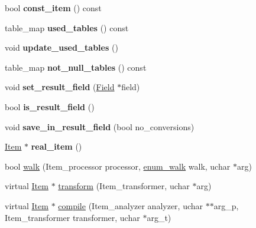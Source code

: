 \begin{DoxyCompactItemize}
\item 
\mbox{\label{classItem__ref_a089ac433fda5b4af1dcd7a5cdf040bb9}} 
bool {\bfseries const\+\_\+item} () const
\item 
\mbox{\label{classItem__ref_a0e11923750254430f834990109c2900a}} 
table\+\_\+map {\bfseries used\+\_\+tables} () const
\item 
\mbox{\label{classItem__ref_acf5ac85e846bfabbcc0da3c3f1b6320d}} 
void {\bfseries update\+\_\+used\+\_\+tables} ()
\item 
\mbox{\label{classItem__ref_a4289b25b0ea00d58796428d46011201e}} 
table\+\_\+map {\bfseries not\+\_\+null\+\_\+tables} () const
\item 
\mbox{\label{classItem__ref_ad004468f78d6395eedc8647dee1033ee}} 
void {\bfseries set\+\_\+result\+\_\+field} (\mbox{\hyperlink{classField}{Field}} $\ast$field)
\item 
\mbox{\label{classItem__ref_aa951652819cce2b03258713e2528b224}} 
bool {\bfseries is\+\_\+result\+\_\+field} ()
\item 
\mbox{\label{classItem__ref_a5adc941f24a078e1a17d9c87bce4d886}} 
void {\bfseries save\+\_\+in\+\_\+result\+\_\+field} (bool no\+\_\+conversions)
\item 
\mbox{\label{classItem__ref_a22c3c3c8ed471fb5bc3e19bf376ce429}} 
\mbox{\hyperlink{classItem}{Item}} $\ast$ {\bfseries real\+\_\+item} ()
\item 
bool \mbox{\hyperlink{classItem__ref_a19c98abd79dbdb19a4af10a7c41f1449}{walk}} (Item\+\_\+processor processor, \mbox{\hyperlink{classItem_a4e68f315ba2a26543339e9f0efed3695}{enum\+\_\+walk}} walk, uchar $\ast$arg)
\item 
virtual \mbox{\hyperlink{classItem}{Item}} $\ast$ \mbox{\hyperlink{classItem__ref_a7918159b3087d8f56a9188e6469f1fd3}{transform}} (Item\+\_\+transformer, uchar $\ast$arg)
\item 
virtual \mbox{\hyperlink{classItem}{Item}} $\ast$ \mbox{\hyperlink{classItem__ref_ae80fb6e36096df4b3c71252166cd70f5}{compile}} (Item\+\_\+analyzer analyzer, uchar $\ast$$\ast$arg\+\_\+p, Item\+\_\+transformer transformer, uchar $\ast$arg\+\_\+t)
$$
\end{DoxyCompactItemize}
